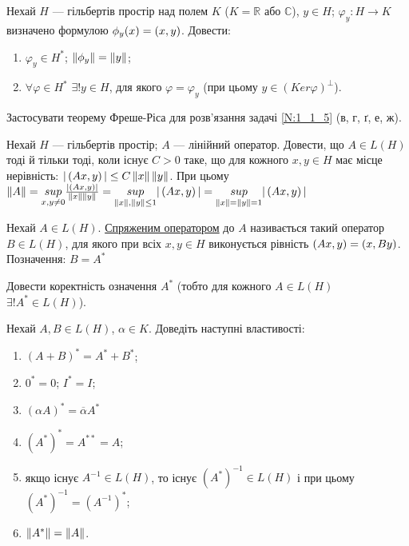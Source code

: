 \begin{exercise}
    Нехай $H$ --- гільбертів простір над полем $K$ ($K=\mathbb{R}$ 
    або $\mathbb{C}$), $y \in H$; $\varphi_y : H \rightarrow K$ визначено 
    формулою $\phi_y(x) = \left(x, y\right)$. Довести:
    \begin{enumerate}[label=\ukr*)]
        \item $\varphi_y \in H^*$; $\left\lVert\phi_y\right\rVert = \left\lVert y\right\rVert$;
        \item $\forall \varphi \in H^*$ $\exists!y\in H$, для якого 
        $\varphi = \varphi_y$ (при цьому $y\in(Ker\varphi)^\bot$).
    \end{enumerate}
\end{exercise}

\begin{exercise}
    Застосувати теорему Фреше-Ріса для розв'язання задачі \ref{N:1_1_5}
    (в, г, ґ, е, ж).
\end{exercise}

\begin{exercise}
    Нехай $H$ --- гільбертів простір; $A$ --- лінійний оператор. 
    Довести, що $A \in L(H)$ тоді й тільки тоді, коли існує 
    $C > 0$ таке, що для кожного $x, y \in H$ має місце нерівність:
    $|\left(Ax, y\right)| \leq C\left\lVert x\right\rVert\left\lVert y\right\rVert$. При цьому $\left\lVert A\right\rVert = 
    \underset{x,y \neq 0}{sup} \frac{|\left(Ax, y\right)|}{\left\lVert x\right\rVert\left\lVert y\right\rVert}
    =\underset{\left\lVert x\right\rVert,\left\lVert y\right\rVert \leq 1}{sup} |\left(Ax, y\right)| = 
    \underset{\left\lVert x\right\rVert = \left\lVert y\right\rVert = 1}{sup} |\left(Ax, y\right)|$
\end{exercise}

\begin{theory}
    Нехай $A \in L(H)$. \uline{Спряженим оператором} до $A$ називається 
    такий оператор $B \in L(H)$, для якого при всіх $x, y \in H$ 
    виконується рівність $\left(Ax, y\right) = \left(x, By\right)$. 
    Позначення: $B = A^*$ 
\end{theory}

\begin{exercise}
    Довести коректність означення $A^*$ (тобто для кожного $A\in L(H)$ 
    $\exists! A^* \in L(H)$).
\end{exercise}

\begin{exercise}
    Нехай $A, B \in L(H)$, $\alpha \in K$. Доведіть наступні властивості:
    \begin{enumerate}[label=\ukr*)]
        \item $(A+B)^* = A^* + B^*$;
        \item $0^*=0$; $I^* = I$;
        \item $(\alpha A)^* = \overline{\alpha}A^*$
        \item $(A^*)^* = A^{**} = A$;
        \item якщо існує $A^{-1} \in L(H)$, то існує $(A^*)^{-1} \in 
        L(H)$ і при цьому $(A^*)^{-1} = (A^{-1})^*$;
        \item $\left\lVert A^*\right\rVert = \left\lVert A\right\rVert$.
    \end{enumerate}
\end{exercise}

